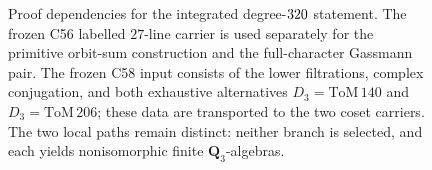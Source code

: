 \begin{figure}[t]
  \centering
  
  \caption{Proof dependencies for the integrated degree-\(320\)
  statement.  The frozen C56 labelled \(27\)-line carrier is used separately
  for the primitive orbit-sum construction and the full-character Gassmann
  pair.  The frozen C58 input consists of the lower filtrations, complex
  conjugation, and both exhaustive alternatives
  \(D_3=\mathrm{ToM}\,140\) and \(D_3=\mathrm{ToM}\,206\); these data are
  transported to the two coset carriers.  The two local paths remain distinct:
  neither branch is selected, and each yields nonisomorphic finite
  \(\mathbf Q_3\)-algebras.}
  \label{fig:c59-proof-dependencies}
\end{figure}
